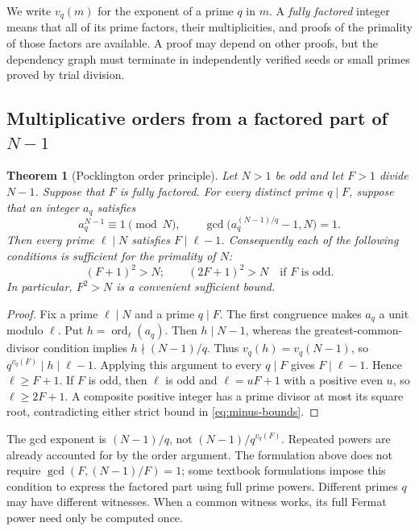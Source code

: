 \documentclass[11pt,a4paper]{article}
\newtheorem{theorem}{Theorem}[section]
\theoremstyle{definition}\newtheorem{definition}[theorem]{Definition}
\theoremstyle{remark}\newtheorem{remark}[theorem]{Remark}
\newcommand{\ord}{\operatorname{ord}}\newcommand{\rad}{\operatorname{rad}}
\begin{document}
We write $v_q(m)$ for the exponent of a prime $q$ in $m$. A \emph{fully factored}
integer means that all of its prime factors, their multiplicities, and proofs
of the primality of those factors are available. A proof may depend on other
proofs, but the dependency graph must terminate in independently verified
seeds or small primes proved by trial division.

\subsection{Multiplicative orders from a factored part of \texorpdfstring{$N-1$}{N-1}}

\begin{theorem}[Pocklington order principle]\label{thm:minus}
Let $N>1$ be odd and let $F>1$ divide $N-1$. Suppose that $F$ is fully factored.
For every distinct prime $q\mid F$, suppose that an integer $a_q$ satisfies
\begin{equation}\label{eq:pock}
 a_q^{N-1}\equiv1\pmod N,\qquad
 \gcd\bigl(a_q^{(N-1)/q}-1,N\bigr)=1.
\end{equation}
Then every prime $\ell\mid N$ satisfies $F\mid\ell-1$. Consequently each of
the following conditions is sufficient for the primality of $N$:
\begin{equation}\label{eq:minus-bounds}
 (F+1)^2>N;\qquad
 (2F+1)^2>N\quad\text{if $F$ is odd}.
\end{equation}
In particular, $F^2>N$ is a convenient sufficient bound.
\end{theorem}

\begin{proof}
Fix a prime $\ell\mid N$ and a prime $q\mid F$. The first congruence makes
$a_q$ a unit modulo $\ell$. Put $h=\ord_{\ell}(a_q)$. Then $h\mid N-1$,
whereas the greatest-common-divisor condition implies $h\nmid(N-1)/q$.
Thus $v_q(h)=v_q(N-1)$, so $q^{v_q(F)}\mid h\mid\ell-1$. Applying this
argument to every $q\mid F$ gives $F\mid\ell-1$. Hence $\ell\ge F+1$.
If $F$ is odd, then $\ell$ is odd and $\ell=uF+1$ with a positive even $u$,
so $\ell\ge2F+1$. A composite positive integer has a prime divisor at most
its square root, contradicting either strict bound in \eqref{eq:minus-bounds}.
\end{proof}

The gcd exponent is $(N-1)/q$, not $(N-1)/q^{v_q(F)}$. Repeated powers are
already accounted for by the order argument. The formulation above does not
require $\gcd(F,(N-1)/F)=1$; some textbook formulations impose this condition
to express the factored part using full prime powers. Different primes $q$
may have different witnesses. When a common witness works, its full Fermat
power need only be computed once.
\end{document}
